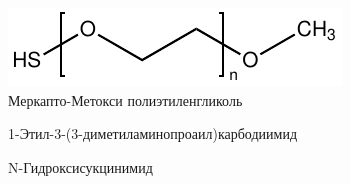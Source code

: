 \documentclass[10pt, a4paper]{article}
\begin{document}
\begin{figure}[ht!]
  \centering
  \includegraphics[scale=1]{hspegoch.pdf}
  \captionsetup{labelformat=empty}
  \caption{Меркапто-Метокси полиэтиленгликоль}
\end{figure}

\begin{figure}[ht!]
  \centering 
  \captionsetup{labelformat=empty}
  \caption{1-Этил-3-(3-диметиламинопроаил)карбодиимид}
\end{figure}

\begin{figure}[ht!]
  \centering 
  \captionsetup{labelformat=empty}
  \caption{N-Гидроксисукцинимид}
\end{figure}

\newpage
\end{document}
